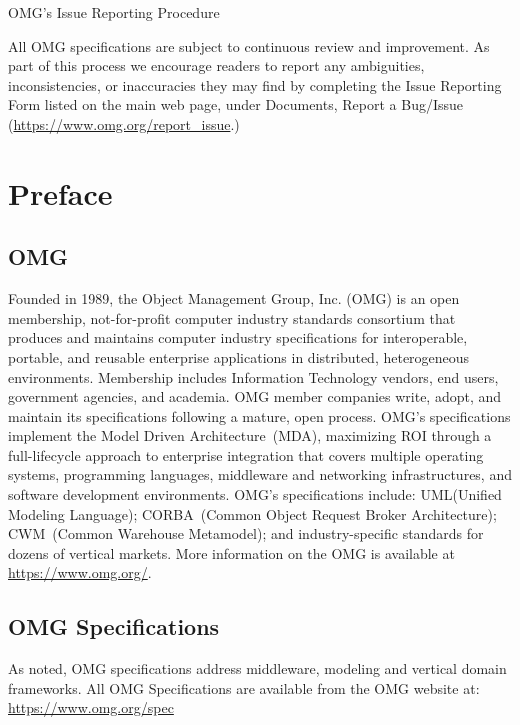 \begin{center}OMG's Issue Reporting Procedure\end{center}\vspace{-3mm}

All OMG specifications are subject to continuous review and improvement. As part of this process we encourage readers to report any ambiguities, inconsistencies, or inaccuracies they may find by completing the Issue Reporting Form listed on the main web page, under Documents, Report a Bug/Issue ({\url{https://www.omg.org/report\_issue}}.)



\tableofcontents{}
\cleardoublepage
\listoffigures
\listoftables
\cleardoublepage

\chapter*{Preface}
\section*{OMG}
Founded in 1989, the Object Management Group, Inc. (OMG) is an open membership, not-for-profit computer industry standards consortium that produces and maintains computer industry specifications for interoperable, portable, and reusable enterprise applications in distributed, heterogeneous environments. Membership includes Information Technology vendors, end users, government agencies, and academia. OMG member companies write, adopt, and maintain its specifications following a mature, open process. OMG's specifications implement the Model Driven Architecture\textregistered\ (MDA\textregistered ), maximizing ROI through a full-lifecycle approach to enterprise integration that covers multiple operating systems, programming languages, middleware and networking infrastructures, and software development environments. OMG's specifications include: UML\textregistered (Unified Modeling Language\texttrademark ); CORBA\textregistered\ (Common Object Request Broker Architecture); CWM\texttrademark\ (Common Warehouse Metamodel); and industry-specific standards for dozens of vertical markets. More information on the OMG is available at \url{https://www.omg.org/}.

\section*{OMG Specifications}
As noted, OMG specifications address middleware, modeling and vertical domain frameworks. All OMG Specifications are available from the OMG website at: \url{https://www.omg.org/spec}


